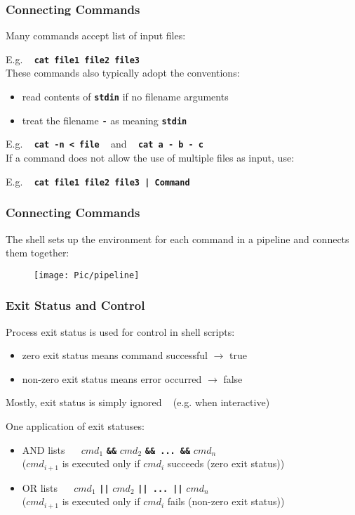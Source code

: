 \begin{frame}
\frametitle{Connecting Commands}
Many commands accept list of input files:

E.g. ~ \textbf{\tt{cat file1 file2 file3}} \\

These commands also typically adopt the conventions:
\begin{itemize}
\item  read contents of \textbf{\tt{stdin}} if no filename arguments
\item  treat the filename \textbf{\tt{-}} as meaning \textbf{\tt{stdin}}
\end{itemize}

E.g. ~ \textbf{\tt{cat -n < file}} ~ and ~ \textbf{\tt{cat a - b - c}} \\

If a command does not allow the use of multiple files as input, use:

E.g. ~ \textbf{\tt{cat file1 file2 file3 | Command}}
\end{frame}

\begin{frame}
\frametitle{Connecting Commands}
The shell sets up the environment for each command in a pipeline and
connects them together:


	\begin{figure}
    	\centering
    	\texttt{[image: Pic/pipeline]}
  	\end{figure}
\end{frame}

\begin{frame}
\frametitle{Exit Status and Control}
Process exit status is used for control in shell scripts:
\begin{itemize}
\item  zero exit status means command successful $\rightarrow$ true
\item  non-zero exit status means error occurred $\rightarrow$ false
\end{itemize}
Mostly, exit status is simply ignored ~ {\small (e.g. when interactive)}

One application of exit statuses:
\begin{itemize}
\item  AND lists ~~ $cmd_{1}$
	\textbf{\tt{\&\&}}
	$cmd_{2}$
	\textbf{\tt{\&\& ... \&\&}}
	$cmd_{n}$ \\
	{\small ($cmd_{i+1}$ is executed only if $cmd_{i}$ succeeds (zero exit status))}
\item  OR lists ~~ $cmd_{1}$ \textbf{\tt{||}} $cmd_{2}$ \textbf{\tt{|| ... ||}} $cmd_{n}$ \\
	{\small ($cmd_{i+1}$ is executed only if $cmd_{i}$ fails (non-zero exit status))}
\end{itemize}
\end{frame}

